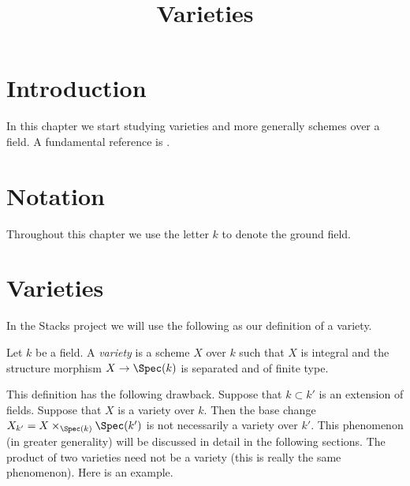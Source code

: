 

%


\title{Varieties}


\maketitle

\label{section-phantom}

\tableofcontents

\section{Introduction}
\label{section-introduction}

\noindent
In this chapter we start studying varieties and more generally
schemes over a field. A fundamental reference is \cite{EGA}.








\section{Notation}
\label{section-notation}

\noindent
Throughout this chapter we use the letter $k$ to denote the ground field.










\section{Varieties}
\label{section-varieties}

\noindent
In the Stacks project we will use the following as our definition
of a variety.

\begin{definition}
\label{definition-variety}
Let $k$ be a field. A {\it variety} is a scheme $X$ over $k$
such that $X$ is integral and the structure morphism
$X \to \Spec(k)$ is separated and of finite type.
\end{definition}

\noindent
This definition has the following drawback. Suppose that
$k \subset k'$ is an extension of fields. Suppose that $X$
is a variety over $k$. Then the base change
$X_{k'} = X \times_{\Spec(k)} \Spec(k')$ is
not necessarily a variety over $k'$. This phenomenon (in greater
generality) will be discussed in detail in the following sections.
The product of two varieties need not be a variety
(this is really the same phenomenon). Here is an example.

